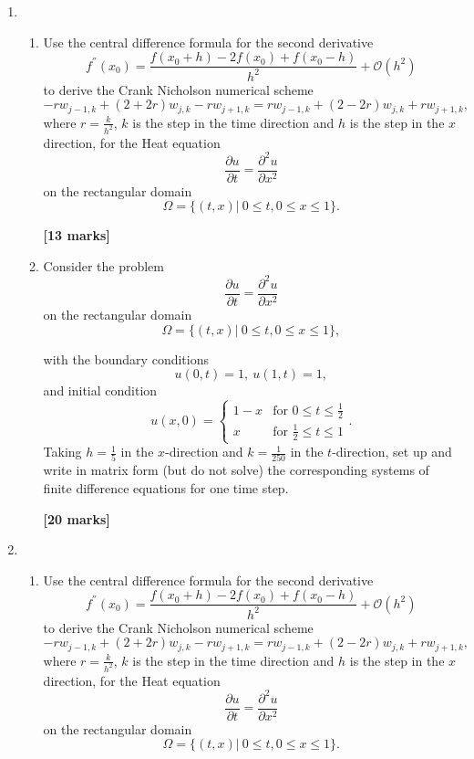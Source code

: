 \begin{enumerate}
	\item 
\begin{enumerate}
	
	\item 
	Use the central difference formula for the second derivative 
	\[ f^{''}(x_0)=\frac{f(x_0+h)-2f(x_0)+f(x_0-h)}{h^2}+\mathcal{O}(h^2)\]
	to derive the Crank Nicholson numerical scheme
	\[-rw_{j-1,k}+(2+2r)w_{j,k}-rw_{j+1,k}=rw_{j-1,k}+(2-2r)w_{j,k}+rw_{j+1,k},\]
	where $r=\frac{k}{h^2}$, $k$ is the step in the time direction and $h$ is the step in the $x$ direction, 
	for the Heat equation 
	\[\frac{\partial u}{\partial t}=\frac{\partial^2 u}{\partial x^2} \]
	on the rectangular domain
	\[\Omega=\{(t,x)| \ 0\leq t, 0 \leq x \leq 1\}. \]

\begin{flushright}
\textbf{[13 marks]}
\end{flushright}
	
	\item Consider the problem
	\[\frac{\partial u}{\partial t}=\frac{\partial^2 u}{\partial x^2} \]
	on the rectangular domain
	\[\Omega=\{(t,x)| \ 0\leq t, 0 \leq x \leq 1\}, \]

	with the boundary conditions
	\[ u(0,t)=1, \ u(1,t)=1,   \]
	and initial condition
	\[	u(x,0)=\begin{cases}
	1-x & \text{for }0\leq t \leq \frac{1}{2}\\
	x & \text{for } \frac{1}{2}\leq t \leq 1
	\end{cases}. \]
		Taking $h=\frac{1}{5}$ in the $x$-direction and $k=\frac{1}{250}$ in the $t$-direction, set up and write in matrix form (but do not solve) the corresponding systems of finite difference equations for one time step.\\
\begin{flushright}
\textbf{[20 marks]}

\end{flushright}
	
	
\end{enumerate}

	\item 
\begin{enumerate}
	
	\item 
	Use the central difference formula for the second derivative 
	\[ f^{''}(x_0)=\frac{f(x_0+h)-2f(x_0)+f(x_0-h)}{h^2}+\mathcal{O}(h^2)\]
	to derive the Crank Nicholson numerical scheme
	\[-rw_{j-1,k}+(2+2r)w_{j,k}-rw_{j+1,k}=rw_{j-1,k}+(2-2r)w_{j,k}+rw_{j+1,k},\]
	where $r=\frac{k}{h^2}$, $k$ is the step in the time direction and $h$ is the step in the $x$ direction, 
	for the Heat equation 
	\[\frac{\partial u}{\partial t}=\frac{\partial^2 u}{\partial x^2} \]
	on the rectangular domain
		\[\Omega=\{(t,x)| \ 0\leq t, 0 \leq x \leq 1\}. \]


\end{enumerate}
\end{enumerate}
